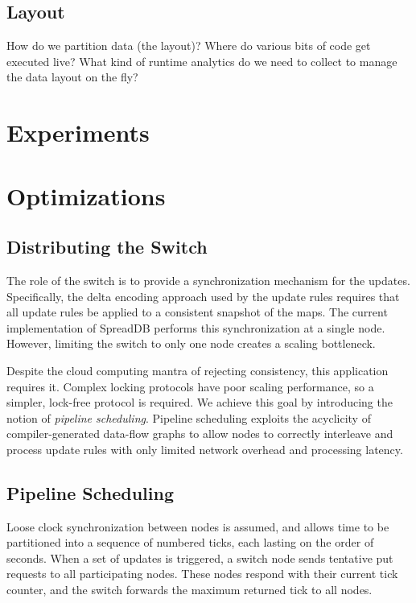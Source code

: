 \documentclass{sig-alternate}
\begin{document}
\subsection{Layout}
How do we partition data (the layout)?  Where do various bits of code get executed live?  What kind of runtime analytics do we need to collect to manage the data layout on the fly? 


\section{Experiments}
\label{sec:experiments}

\section{Optimizations}
\label{sec:optimizations}

\subsection{Distributing the Switch}
\label{sec:distswitch}
The role of the switch is to provide a synchronization mechanism for the updates.  Specifically, the delta encoding approach used by the update rules requires that all update rules be applied to a consistent snapshot of the maps.  The current implementation of SpreadDB performs this synchronization at a single node.  However, limiting the switch to only one node creates a scaling bottleneck.  

Despite the cloud computing mantra of rejecting consistency, this application requires it.  Complex locking protocols have poor scaling performance, so a simpler, lock-free protocol is required.  We achieve this goal by introducing the notion of \textit{pipeline scheduling}.  Pipeline scheduling exploits the acyclicity of compiler-generated data-flow graphs to allow nodes to correctly interleave and process update rules with only limited network overhead and processing latency.

\subsection{Pipeline Scheduling}
Loose clock synchronization between nodes is assumed, and allows time to be partitioned into a sequence of numbered ticks, each lasting on the order of seconds.  When a set of updates is triggered, a switch node sends tentative put requests to all participating nodes.  These nodes respond with their current tick counter, and the switch forwards the maximum returned tick to all nodes.
\end{document}
